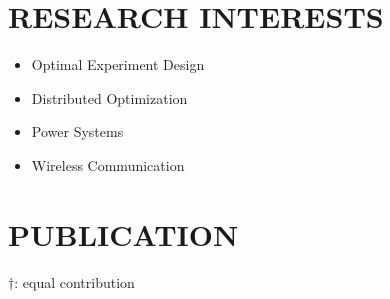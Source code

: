 \documentclass[paper=a4,fontsize=11pt]{scrartcl} %
\newcommand{\NewPart}[1]{\section*{\uppercase{#1}}}
\newcommand{\EducationEntry}[4]{
		\noindent \textbf{#1} \hfill      %
		\colorbox{White}{%
			\parbox{5cm}{%
			\hfill\color{Black}#2}} \par  %
		\noindent \textit{#3} \par        %
		\noindent\hangindent=2em\hangafter=0 \small #4 %
		\normalsize \par}
\begin{document}
\NewPart{RESEARCH INTERESTS}{}
\begin{itemize}
	\item{Optimal Experiment Design}
	
	\item{Distributed Optimization}
	
	\item{Power Systems}
	\item{Wireless Communication}
\end{itemize}


\NewPart{PUBLICATION}{}
$\dag$:  equal contribution
\end{document}
